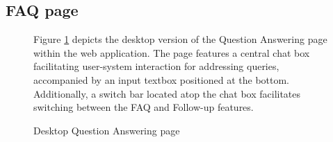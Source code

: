 \documentclass[12pt,oneside,openright,a4paper]{cpe-english-project}
\begin{document}
    \subsection{FAQ page}
    \begin{figure}[H]
      \centering
      \caption{Desktop Question Answering page}\label{fig:Desk_FAQ}
      \begin{justify}
        \qquad Figure \ref{fig:Desk_FAQ} depicts the desktop version of the Question Answering page within the web application. The page features a central chat box facilitating user-system interaction for addressing queries, accompanied by an input textbox positioned at the bottom. Additionally, a switch bar located atop the chat box facilitates switching between the FAQ and Follow-up features. \par
      \end{justify}
    \end{figure}
\end{document}
